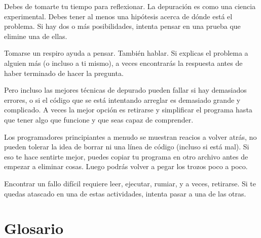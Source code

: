 
Debes de tomarte tu tiempo para reflexionar. La depuración es como una
ciencia experimental. Debes tener al menos una hipótesis acerca
de dónde está el problema. Si hay dos o más posibilidades, intenta
pensar en una prueba que elimine una de ellas.

Tomarse un respiro ayuda a pensar. También hablar.
Si explicas el problema a alguien más (o incluso a ti mismo),
a veces encontrarás la respuesta antes de haber terminado de hacer la pregunta.

Pero incluso las mejores técnicas de depurado pueden fallar si hay demasiados
errores, o si el código que se está intentando arreglar es demasiado grande
y complicado. A veces la mejor opción es retirarse y simplificar el
programa hasta que tener algo que funcione y que seas
capaz de comprender.

Los programadores principiantes a menudo se muestran reacios a volver atrás,
no pueden tolerar la idea de borrar ni una línea de código (incluso si está mal).
Si eso te hace sentirte mejor, puedes copiar tu programa en otro archivo
antes de empezar a eliminar cosas. Luego podrás volver a pegar los
trozos poco a poco.

Encontrar un fallo difícil requiere leer, ejecutar, rumiar, y
a veces, retirarse. Si te quedas atascado en una de estas actividades,
intenta pasar a una de las otras.


\section{Glosario}

